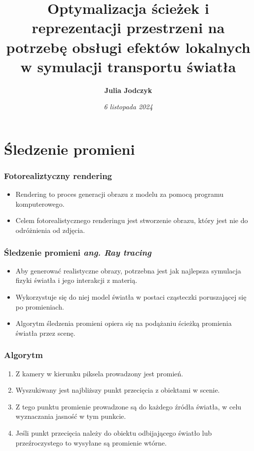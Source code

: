 \documentclass{beamer}
\title[ \insertframenumber/\inserttotalframenumber]{Optymalizacja ścieżek i reprezentacji przestrzeni na potrzebę obsługi efektów lokalnych w symulacji transportu światła}
\author[Julia Jodczyk]{\textbf{Julia Jodczyk}}
\institute{Instytut Informatyki \\
dr inż. Łukasz Dąbała}
\date{\tiny{\emph{6 listopada 2024
}}}
\begin{document}
\frame{\titlepage}


\section{Śledzenie promieni}

\begin{frame}
\frametitle{Fotorealiztyczny rendering}
\begin{itemize}
    \item Rendering to proces generacji obrazu z modelu za pomocą programu komputerowego.
    \item Celem fotorealistycznego renderingu jest stworzenie obrazu, który jest nie do odróżnienia od zdjęcia.
\end{itemize}
\end{frame}

\begin{frame}
\frametitle{Śledzenie promieni \it{ang. Ray tracing}}
\begin{itemize}
    \item Aby generować realistyczne obrazy, potrzebna jest jak najlepsza symulacja fizyki światła i jego interakcji z materią.
    \item Wykorzystuje się do niej model światła w postaci cząsteczki poruszającej się po promieniach.
    \item Algorytm śledzenia promieni opiera się na podążaniu ścieżką promienia światła przez scenę.
\end{itemize}
\end{frame}

\begin{frame}
\frametitle{Algorytm}
\begin{enumerate}
    \item Z kamery w kierunku piksela prowadzony jest promień.
    \item Wyszukiwany jest najbliższy punkt przecięcia z obiektami w scenie.
    \item Z tego punktu promienie prowadzone są do każdego źródła światła, w celu wyznaczania jasność w tym punkcie.
    \item Jeśli punkt przecięcia należy do obiektu odbijającego światło lub przeźroczystego to wysyłane są promienie wtórne.
\end{enumerate}
\end{frame}
\end{document}
